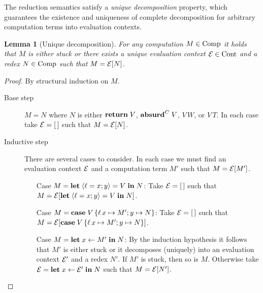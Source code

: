 \documentclass[12pt,phd,lfcs,twoside,openright,logo,leftchapter,normalheadings]{infthesis}
\theoremstyle{plain}
\newtheorem{lemma}[theorem]{Lemma}
\theoremstyle{definition}
\begin{document}
The reduction semantics satisfy a \emph{unique decomposition}
property, which guarantees the existence and uniqueness of complete
decomposition for arbitrary computation terms into evaluation
contexts.
%
\begin{lemma}[Unique decomposition]\label{lem:base-language-uniq-decomp}
  For any computation $M \in \textrm{Comp}$ it holds that $M$ is either
  stuck or there exists a unique evaluation context $\mathcal{E} \in \textrm{Cont}$
  and a redex $N \in \textrm{Comp}$ such that $M = \mathcal{E}[N]$.
\end{lemma}
%
\begin{proof}
  By structural induction on $M$.
  \begin{description}
  \item[Base step] $M = N$ where $N$ is either $\mathbf{return}\;V$,
    $\mathbf{absurd}^C\;V$, $V\,W$, or $V\,T$. In each case take $\mathcal{E} = [\,]$
    such that $M = \mathcal{E}[N]$.
  \item[Inductive step]
    There are several cases to consider. In each case we must find an
    evaluation context $\mathcal{E}$ and a computation term $M'$ such that
    $M = \mathcal{E}[M']$.
    \begin{itemize}
      \item[Case] $M = \mathbf{let}\;\langle \ell = x; y \rangle = V\;\mathbf{in}\;N$: Take $\mathcal{E} = [\,]$ such that $M = \mathcal{E}[\mathbf{let}\;\langle \ell = x; y \rangle = V\;\mathbf{in}\;N]$.
      \item[Case] $M = \mathbf{case}\;V\,\{\ell\,x \mapsto M'; y \mapsto N\}$:
        Take $\mathcal{E} = [\,]$ such that
        $M = \mathcal{E}[\mathbf{case}\;V\,\{\ell\,x \mapsto M'; y \mapsto N\}]$.
      \item[Case] $M = \mathbf{let}\;x \leftarrow M' \;\mathbf{in}\;N$: By the induction
        hypothesis it follows that $M'$ is either stuck or it
        decomposes (uniquely) into an evaluation context $\mathcal{E}'$ and a
        redex $N'$. If $M'$ is stuck, then so is $M$. Otherwise take
        $\mathcal{E} = \mathbf{let}\;x \leftarrow \mathcal{E}'\;\mathbf{in}\;N$ such that $M = \mathcal{E}[N']$.
    \end{itemize}
  \end{description}
\end{proof}
\end{document}
